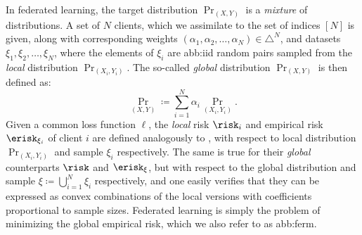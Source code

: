 In federated learning, the target distribution \(\Pr_{(X, Y)}\)
is a \emph{mixture} of distributions.
A set of \(N\) clients, which we assimilate to the set of indices \([N]\) is given,
along with corresponding weights
\((\alpha_{1}, \alpha_{2}, \dots, \alpha_{N}) \in \triangle^{N}\),
and datasets \(\xi_{1}, \xi_{2}, \dots, \xi_{N}\),
where the elements of \(\xi_{i}\) are \gls{abb:iid} random pairs
sampled from the \emph{local} distribution \(\Pr_{(X_{i}, Y_{i})}\).
The so-called \emph{global} distribution \(\Pr_{(X, Y)}\) is then defined as:
\begin{equation}
  \Pr_{(X, Y)} \coloneqq \sum_{i=1}^{N} \alpha_{i} \Pr_{(X_{i}, Y_{i})}.
\end{equation}
Given a common loss function \(\ell\),
the \emph{local} risk \(\risk_{i}\) and empirical risk \(\erisk_{\xi_{i}}\)
of client \(i\) are defined analogously to ,
with respect to local distribution
\(\Pr_{(X_{i}, Y_{i})}\) and sample \(\xi_{i}\) respectively.
The same is true for their \emph{global} counterparts \(\risk\) and \(\erisk_{\xi}\),
but with respect to the global distribution and sample
\(\xi \coloneqq \bigcup_{i=1}^{N} \xi_{i}\)
respectively,
and one easily verifies that they can be expressed as convex combinations of the local versions
with coefficients proportional to sample sizes.
Federated learning is simply the problem of minimizing the global empirical risk,
which we also refer to as \gls{abb:ferm}.


